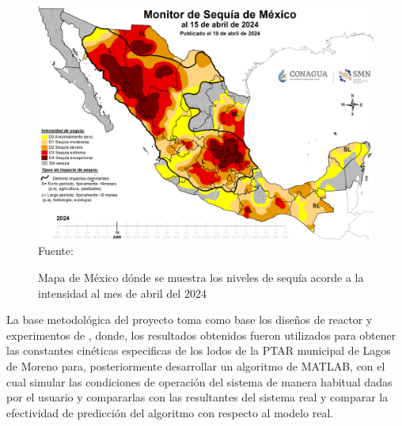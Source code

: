 \begin{figure}[H]
	\centering
	\includegraphics[scale=0.35]{../Images/Sequia.pdf}
	\\\small{Fuente: \cite{CNA2024}}
	\caption{Mapa de México dónde se muestra los niveles de sequía acorde a la intensidad al mes de abril del 2024}\label{fig:sequia}
\end{figure}
La base metodológica del proyecto toma como base los diseños de reactor y experimentos de \cite{Ramalho2003}, donde, los resultados obtenidos fueron utilizados para obtener las constantes cinéticas especificas de los lodos de la \acrshort{PTAR} municipal de Lagos de Moreno para, posteriormente desarrollar un algoritmo de MATLAB, con el cual simular las condiciones de operación del sistema de manera habitual dadas por el usuario y compararlas con las resultantes del sistema real y comparar la efectividad de predicción del algoritmo con respecto al modelo real.